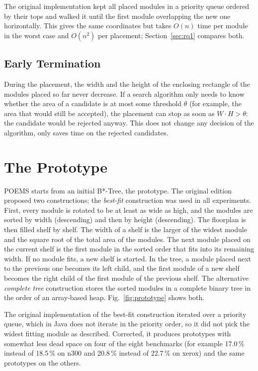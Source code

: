 The original implementation kept all placed modules in a priority queue ordered by their tops and walked it until the first module overlapping the new one horizontally. This gives the same coordinates but takes $O(n)$ time per module in the worst case and $O(n^2)$ per placement; Section~\ref{sec:rq1} compares both.

\subsection{Early Termination}
\label{sec:earlyexit}

During the placement, the width and the height of the enclosing rectangle of the modules placed so far never decrease. If a search algorithm only needs to know whether the area of a candidate is at most some threshold $\theta$ (for example, the area that would still be accepted), the placement can stop as soon as $W \cdot H > \theta$: the candidate would be rejected anyway. This does not change any decision of the algorithm, only saves time on the rejected candidates.

\section{The Prototype}

POEMS starts from an initial B*-Tree, the prototype. The original edition proposed two constructions; the {\em best-fit} construction was used in all experiments. First, every module is rotated to be at least as wide as high, and the modules are sorted by width (descending) and then by height (descending). The floorplan is then filled shelf by shelf. The width of a shelf is the larger of the widest module and the square root of the total area of the modules. The next module placed on the current shelf is the first module in the sorted order that fits into its remaining width. If no module fits, a new shelf is started. In the tree, a module placed next to the previous one becomes its left child, and the first module of a new shelf becomes the right child of the first module of the previous shelf. The alternative {\em complete tree} construction stores the sorted modules in a complete binary tree in the order of an array-based heap. Fig.~\ref{fig:prototype} shows both.

The original implementation of the best-fit construction iterated over a priority queue, which in Java does not iterate in the priority order, so it did not pick the widest fitting module as described. Corrected, it produces prototypes with somewhat less dead space on four of the eight benchmarks (for example 17.0\,\% instead of 18.5\,\% on n300 and 20.8\,\% instead of 22.7\,\% on xerox) and the same prototypes on the others.


